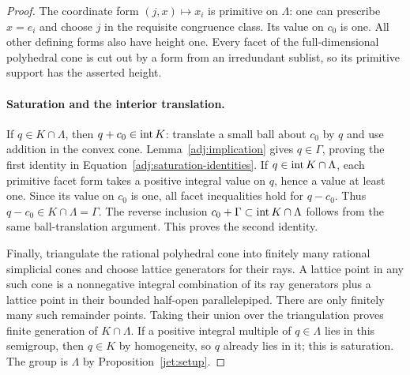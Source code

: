 \begin{proof}
The coordinate form $(j,x)\mapsto x_i$ is primitive on $\Lambda$:
one can prescribe $x=e_i$ and choose $j$ in the requisite congruence
class.  Its value on $c_0$ is one.  All other defining forms also
have height one.  Every facet of the full-dimensional polyhedral
cone is cut out by a form from an irredundant sublist, so its
primitive support has the asserted height.

\paragraph{Saturation and the interior translation.}
If $q\in K\cap\Lambda$, then $q+c_0\in\operatorname{int} K$: translate a
small ball about $c_0$ by $q$ and use addition in the convex cone.
Lemma~\ref{adj:implication} gives $q\in\Gamma$, proving the first
identity in Equation~\eqref{adj:saturation-identities}.
If $q\in\operatorname{int} K\cap\Lambda$, each primitive facet form takes a
positive integral value on $q$, hence a value at least one.  Since
its value on $c_0$ is one, all facet inequalities hold for $q-c_0$.
Thus $q-c_0\in K\cap\Lambda=\Gamma$.  The reverse inclusion
$c_0+\Gamma\subset\operatorname{int} K\cap\Lambda$ follows from the same
ball-translation argument.  This proves the second identity.

Finally, triangulate the rational polyhedral cone into finitely many
rational simplicial cones and choose lattice generators for their
rays.  A lattice point in any such cone is a nonnegative integral
combination of its ray generators plus a lattice point in their
bounded half-open parallelepiped.  There are only finitely many
such remainder points.  Taking their union over the triangulation
proves finite generation of $K\cap\Lambda$.  If a positive integral
multiple of $q\in\Lambda$ lies in this semigroup, then $q\in K$
by homogeneity, so $q$ already lies in it; this is saturation.
The group is $\Lambda$ by Proposition~\ref{jet:setup}.
\end{proof}
